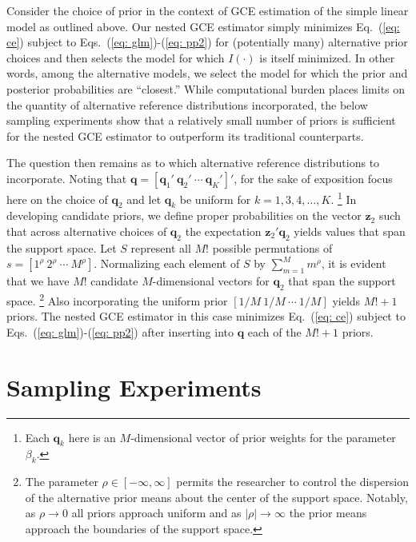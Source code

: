 \documentclass[english]{article}
\begin{document}
Consider the choice of prior in the context of GCE estimation of the simple 
linear model as outlined above.
Our nested GCE estimator simply minimizes Eq.\ (\ref{eq: ce}) subject to 
Eqs.\ (\ref{eq: glm})-(\ref{eq: pp2}) for (potentially many) alternative prior 
choices and then selects the model for which $I(\cdot)$ is itself minimized.
In other words, among the alternative models, we select the model for which the 
prior and posterior probabilities are ``closest.''
While computational burden places limits on the quantity of alternative 
reference distributions incorporated, the below sampling experiments show 
that a relatively small number of priors is sufficient for the nested GCE 
estimator to outperform its traditional counterparts.

The question then remains as to which alternative reference distributions to 
incorporate.
Noting that $\mathbf{q}=[\mathbf{q}_1' ~ \mathbf{q}_2' ~ 
\cdots ~ \mathbf{q}_K' ]'$, for the sake of exposition focus here on the 
choice of $\mathbf{q}_2$ and let $\mathbf{q}_k$ be uniform for 
$k=1,3,4,\ldots, K$.%
\footnote{Each $\mathbf{q}_k$ here is an $M$-dimensional vector of 
 prior weights for the parameter $\beta_k$.}
In developing candidate priors, we define proper probabilities on the vector 
$\mathbf{z}_2$ such that across alternative choices of $\mathbf{q}_2$ the 
expectation $\mathbf{z}_2'\mathbf{q}_2$  yields values that span the 
support space. 
Let $S$ represent all  $M!$ possible permutations of 
$s = [1^\rho ~ 2^\rho ~ \cdots ~ M^\rho]$.
Normalizing each element of $S$ by $\sum_{m=1}^M m^\rho$, it is evident
that we have $M!$ candidate $M$-dimensional vectors for 
$\mathbf{q}_2$ that span the support space.%
\footnote{The parameter $\rho \in [-\infty, \infty]$ permits the researcher
to control the dispersion of the alternative prior means about the center of the 
support space.
Notably, as $\rho \to 0$ all priors approach uniform and as $|\rho| \to 
\infty$ the prior means approach the boundaries of the support space.}
Also incorporating the uniform prior $[1/M ~ 1/M ~ \cdots ~ 1/M]$ yields 
$M! + 1$ priors.
The nested GCE estimator in this case minimizes Eq.\ (\ref{eq: ce}) subject 
to Eqs.\ (\ref{eq: glm})-(\ref{eq: pp2}) after inserting into $\mathbf{q}$ 
each of the $M! + 1$ priors.


\section{Sampling Experiments}
\label{sec: mce}
\end{document}
